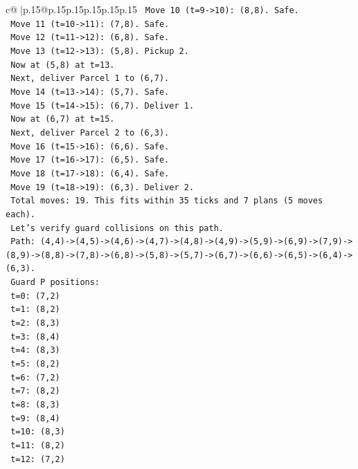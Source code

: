 \documentclass{article}
\begin{document}
{\begin{supertabular}{c@{$\;$}|p{.15\linewidth}@{}p{.15\linewidth}p{.15\linewidth}p{.15\linewidth}p{.15\linewidth}p{.15\linewidth}}
{{{\texttt{   Move 10 (t=9{-}>10): (8,8). Safe.} \\
\texttt{   Move 11 (t=10{-}>11): (7,8). Safe.} \\
\texttt{   Move 12 (t=11{-}>12): (6,8). Safe.} \\
\texttt{   Move 13 (t=12{-}>13): (5,8). Pickup 2.} \\
\texttt{   Now at (5,8) at t=13.} \\
\texttt{   Next, deliver Parcel 1 to (6,7).} \\
\texttt{   Move 14 (t=13{-}>14): (5,7). Safe.} \\
\texttt{   Move 15 (t=14{-}>15): (6,7). Deliver 1.} \\
\texttt{   Now at (6,7) at t=15.} \\
\texttt{   Next, deliver Parcel 2 to (6,3).} \\
\texttt{   Move 16 (t=15{-}>16): (6,6). Safe.} \\
\texttt{   Move 17 (t=16{-}>17): (6,5). Safe.} \\
\texttt{   Move 18 (t=17{-}>18): (6,4). Safe.} \\
\texttt{   Move 19 (t=18{-}>19): (6,3). Deliver 2.} \\
\texttt{   Total moves: 19. This fits within 35 ticks and 7 plans (5 moves each).} \\
\texttt{   Let's verify guard collisions on this path.} \\
\texttt{   Path: (4,4){-}>(4,5){-}>(4,6){-}>(4,7){-}>(4,8){-}>(4,9){-}>(5,9){-}>(6,9){-}>(7,9){-}>(8,9){-}>(8,8){-}>(7,8){-}>(6,8){-}>(5,8){-}>(5,7){-}>(6,7){-}>(6,6){-}>(6,5){-}>(6,4){-}>(6,3).} \\
\texttt{   Guard P positions:} \\
\texttt{   t=0: (7,2)} \\
\texttt{   t=1: (8,2)} \\
\texttt{   t=2: (8,3)} \\
\texttt{   t=3: (8,4)} \\
\texttt{   t=4: (8,3)} \\
\texttt{   t=5: (8,2)} \\
\texttt{   t=6: (7,2)} \\
\texttt{   t=7: (8,2)} \\
\texttt{   t=8: (8,3)} \\
\texttt{   t=9: (8,4)} \\
\texttt{   t=10: (8,3)} \\
\texttt{   t=11: (8,2)} \\
\texttt{   t=12: (7,2)} \\
}}}
\end{supertabular}}
\end{document}
